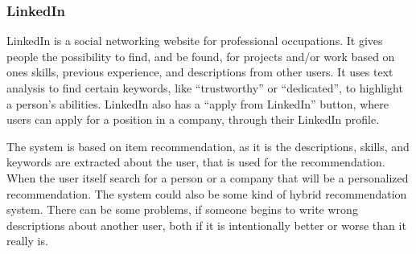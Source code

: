 \subsubsection{LinkedIn}

LinkedIn is a social networking website for professional occupations. It gives people the possibility to find, and be found, for projects and/or work based on ones skills, previous experience, and descriptions from other users. It uses text analysis to find certain keywords, like “trustworthy” or “dedicated”, to highlight a person's abilities. LinkedIn also has a “apply from LinkedIn” button, where users can apply for a position in a company, through their LinkedIn profile. 

The system is based on item recommendation, as it is the descriptions, skills, and keywords are extracted about the user, that is used for the recommendation. When the user itself search for a person or a company that will be a personalized recommendation. The system could also be some kind of hybrid recommendation system. There can be some problems, if someone begins to write wrong descriptions about another user, both if it is intentionally better or worse than it really is.